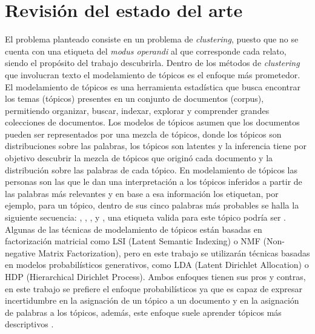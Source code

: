\documentclass[letterpaper,12pt,oneside]{book} %
\begin{document}
\section{Revisión del estado del arte}

El problema planteado consiste en un problema de \textit{clustering}, puesto que no se cuenta con una etiqueta del \textit{modus operandi} al que corresponde cada relato, siendo el propósito del trabajo descubrirla. Dentro de los métodos de \textit{clustering} que involucran texto el modelamiento de tópicos es el enfoque más prometedor.%
El modelamiento de tópicos es una herramienta estadística que busca encontrar los temas (tópicos) presentes en un conjunto de documentos (corpus), permitiendo organizar, buscar, indexar, explorar y comprender grandes colecciones de documentos. %
Los modelos de tópicos asumen que los documentos pueden ser representados por una mezcla de tópicos, donde los tópicos son distribuciones sobre las palabras, los tópicos son latentes y la inferencia tiene por objetivo descubrir la mezcla de tópicos que originó cada documento y la distribución sobre las palabras de cada tópico. En modelamiento de tópicos las personas son las que le dan una interpretación a los tópicos inferidos a partir de las palabras más relevantes y en base a esa información los etiquetan, por ejemplo, para un tópico, dentro de sus cinco palabras más probables se halla la siguiente secuencia: , , ,  y , una etiqueta valida para este tópico podría ser .\\

Algunas de las técnicas de modelamiento de tópicos están basadas en factorización matricial como LSI (Latent Semantic Indexing) \citep{dumais2004latent} o NMF (Non-negative Matrix Factorization)\citep{xu2003document}, pero en este trabajo se utilizarán técnicas basadas en modelos probabilísticos generativos, como LDA (Latent Dirichlet Allocation)\citep{blei2003latent} o HDP (Hierarchical Dirichlet Process)\citep{teh2005sharing}. Ambos enfoques tienen sus pros y contras, en este trabajo se prefiere el enfoque probabilísticos ya que es capaz de expresar incertidumbre en la asignación de un tópico a un documento y en la asignación de palabras a los tópicos, además, este enfoque suele aprender tópicos más descriptivos \citep{stevens2012exploring}.\\
\end{document}
